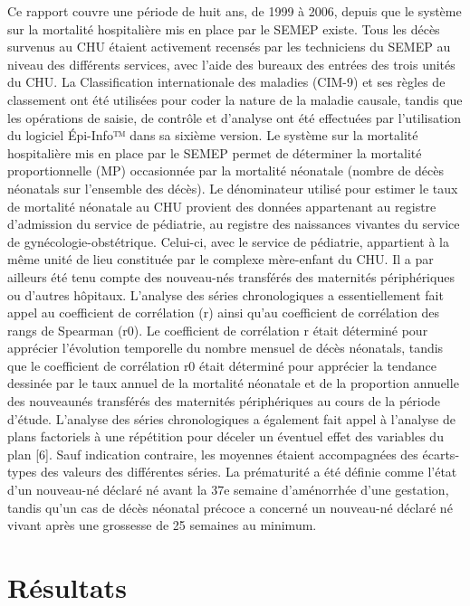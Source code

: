 \documentclass[
]{book}
\begin{document}
Ce rapport couvre une période de huit ans, de 1999 à 2006,
depuis que le système sur la mortalité hospitalière mis en
place par le SEMEP existe. Tous les décès survenus au CHU
étaient activement recensés par les techniciens du SEMEP au
niveau des différents services, avec l'aide des bureaux des
entrées des trois unités du CHU.
La Classification internationale des maladies (CIM-9) et
ses règles de classement ont été utilisées pour coder la nature
de la maladie causale, tandis que les opérations de saisie, de
contrôle et d'analyse ont été effectuées par l'utilisation du
logiciel Épi-Info™ dans sa sixième version.
Le système sur la mortalité hospitalière mis en place par le
SEMEP permet de déterminer la mortalité proportionnelle
(MP) occasionnée par la mortalité néonatale (nombre de
décès néonatals sur l'ensemble des décès). Le dénominateur
utilisé pour estimer le taux de mortalité néonatale au CHU
provient des données appartenant au registre d'admission du
service de pédiatrie, au registre des naissances vivantes du
service de gynécologie-obstétrique. Celui-ci, avec le service
de pédiatrie, appartient à la même unité de lieu constituée par
le complexe mère-enfant du CHU. Il a par ailleurs été tenu
compte des nouveau-nés transférés des maternités périphériques
ou d'autres hôpitaux.
L'analyse des séries chronologiques a essentiellement fait
appel au coefficient de corrélation (r) ainsi qu'au coefficient
de corrélation des rangs de Spearman (r0). Le coefficient de
corrélation r était déterminé pour apprécier l'évolution
temporelle du nombre mensuel de décès néonatals, tandis
que le coefficient de corrélation r0 était déterminé pour
apprécier la tendance dessinée par le taux annuel de la
mortalité néonatale et de la proportion annuelle des nouveaunés
transférés des maternités périphériques au cours de la
période d'étude. L'analyse des séries chronologiques a
également fait appel à l'analyse de plans factoriels à une
répétition pour déceler un éventuel effet des variables du plan
{[}6{]}. Sauf indication contraire, les moyennes étaient accompagnées
des écarts-types des valeurs des différentes séries.
La prématurité a été définie comme l'état d'un nouveau-né
déclaré né avant la 37e semaine d'aménorrhée d'une
gestation, tandis qu'un cas de décès néonatal précoce a
concerné un nouveau-né déclaré né vivant après une
grossesse de 25 semaines au minimum.

\hypertarget{ruxe9sultats}{%
\chapter{Résultats}\label{ruxe9sultats}}
\end{document}
